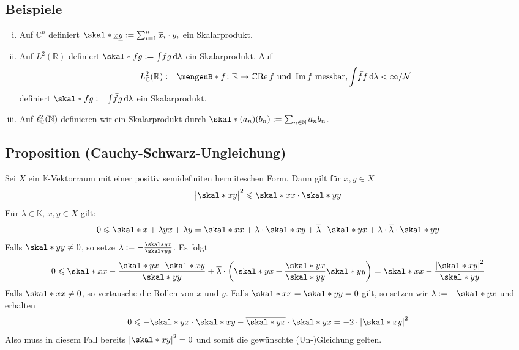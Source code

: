 \subsection[Beispiele für hermitesche Formen]{Beispiele} %
\label{sub:73}
\begin{enumerate}[(i)]
	\item Auf $\mathds{C}^n$ definiert $\skal*{\underline{x}}{\underline{y}} := \sum_{i=1}^{n} \overline{x}_i \cdot y_i$ ein Skalarprodukt.
	\item Auf $L^2(\mathds{R})$ definiert $\skal*{f}{g} := \int\! f  g \,\mathd\lambda$ ein Skalarprodukt.
	Auf 
	\[
		L^2_\mathds{C}(\mathds{R}) := \set[f \colon \mathds{R} \to \mathds{C}]{\re f \text{ und } \im f \text{ messbar}, \int \! \bar{f} f\, \mathd\lambda < \infty } / \mathcal{N}
	\]
	definiert $\skal*{f}{g} := \int\! \bar{f} g \, \mathd\lambda$ ein Skalarprodukt.
	\item Auf $\ell^2_{\color{gray}\mathds{C}}(\mathds{N})$ definieren wir ein Skalarprodukt durch $\skal*{(a_n)}{(b_n)} := \sum_{n \in \mathds{N}} \overline{a}_n b_n$.
\end{enumerate}

\subsection{Proposition (Cauchy-Schwarz-Ungleichung)} %
\label{sub:74}
Sei $X$ ein $\mathds{K}$-Vektorraum mit einer positiv semidefiniten hermiteschen Form. Dann gilt für $x,y \in X$ 
\[
	\abs[\big]{\skal*{x}{y}}^2 \le \skal*{x}{x} \cdot \skal*{y}{y}
\]
Für $\lambda \in \mathds{K}$, $x,y \in X$ gilt: 
\begin{align*}
	0 \le \skal*{x+\lambda y}{x + \lambda y} = \skal*{x}{x} + \lambda \cdot \skal*{x}{y} + \overline{\lambda} \cdot \skal*{y}{x} 
	+ \lambda \cdot \overline{\lambda} \cdot \skal*{y}{y}  
\end{align*}
Falls $\skal*{y}{y} \not=0$, so setze $\lambda := - \frac{\skal*{y}{x}}{\skal*{y}{y}}$. Es folgt 
\begin{align*}
	0 \le \skal*{x}{x} - \frac{\skal*{y}{x} \cdot \skal*{x}{y}}{\skal*{y}{y}} + \overline{\lambda} \cdot \enbrace*{\skal*{y}{x}  
	- \frac{\skal*{y}{x}}{\skal*{y}{y}} \skal*{y}{y}   } = \skal*{x}{x} - \frac{\abs*{\skal*{x}{y}}^2 }{\skal*{y}{y}} 
\end{align*}
Falls $\skal*{x}{x} \not= 0$, so vertausche die Rollen von $x$ und $y$. Falls $\skal*{x}{x}=\skal*{y}{y}=0$ gilt, so setzen wir $\lambda := - \skal*{y}{x}$ und erhalten
\[
	0 \le - \skal*{y}{x} \cdot \skal*{x}{y} - \overline{\skal*{y}{x}} \cdot \skal*{y}{x} = -2 \cdot \abs*{\skal*{x}{y}}^2 
\]
Also muss in diesem Fall bereits $\abs*{\skal*{x}{y}}^2 =0$ und somit die gewünschte (Un-)Gleichung gelten. \bewende

